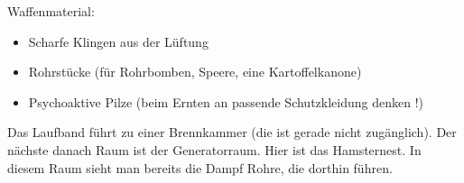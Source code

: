 Waffenmaterial:

\begin{itemize}
\item Scharfe Klingen aus der Lüftung
\item Rohrstücke (für Rohrbomben, Speere, eine Kartoffelkanone)
\item Psychoaktive Pilze (beim Ernten an passende Schutzkleidung denken !)
\end{itemize}

Das Laufband führt zu einer Brennkammer (die ist gerade nicht zugänglich). Der nächste danach Raum ist der Generatorraum. Hier ist das Hamsternest.
In diesem Raum sieht man bereits die Dampf Rohre, die dorthin führen.

\begin{npcBox}[title=Lucien\, Director]

    \begin{aspects}
    \item {}
    \item {}
    \end{aspects}

    \begin{skills}
    \item {}
    \item  {}
    \item {}
    \item {}
    \item {}
    \item {}
    \item {}
    \item {}
    \item {}
    \item {}
    \item {}
    \item {}
    \item {}
    \item {}
    \item {}
    \item {}
    \item {}
    \item {}
    \item {}
    \end{skills}


\end{npcBox}

